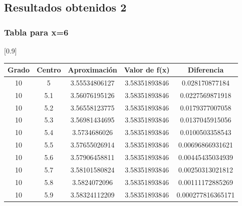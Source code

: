 \documentclass{beamer}
\begin{document}
\subsection{Resultados obtenidos 2}
\begin{frame}
 \frametitle{Tabla para x=6}
\begin{table}[htb]
\begin{center}
\scalebox{0.9}[0.9]{
  
  \begin{tabular}{|c|c|c|c|c|} %
  \hline
         Grado   &  Centro  &  Aproximación    &  Valor de f(x)  &  Diferencia        \\ \hline
            10   &   5      &  3.55534806127   &  3.58351893846  &  0.028170877184    \\ \hline
            10   &   5.1    &  3.56076195126   &  3.58351893846  &  0.0227569871918   \\ \hline
            10   &   5.2    &  3.56558123775   &  3.58351893846  &  0.0179377007058   \\ \hline
            10   &   5.3    &  3.56981434695   &  3.58351893846  &  0.0137045915056   \\ \hline
            10   &   5.4    &  3.5734686026    &  3.58351893846  &  0.0100503358543   \\ \hline
            10   &   5.5    &  3.57655026914   &  3.58351893846  &  0.00696866931621  \\ \hline
            10   &   5.6    &  3.57906458811   &  3.58351893846  &  0.00445435034939  \\ \hline
            10   &   5.7    &  3.58101580824   &  3.58351893846  &  0.00250313021812  \\ \hline
            10   &   5.8    &  3.5824072096    &  3.58351893846  &  0.00111172885269  \\ \hline
            10   &   5.9    &  3.58324112209   &  3.58351893846  &  0.000277816365171 \\ \hline
   \end{tabular}
   }
   \label{Tabla5}
   \end{center}
\end{table}

\end{frame}
\end{document}
